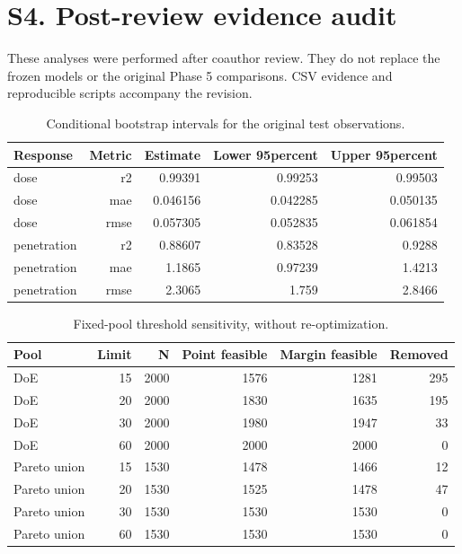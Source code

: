 \section*{S4. Post-review evidence audit}

These analyses were performed after coauthor review. They do not replace the frozen models or the original Phase 5 comparisons. CSV evidence and reproducible scripts accompany the revision.

\begin{table}[H]\centering\scriptsize
\caption{Conditional bootstrap intervals for the original test observations.}
\begin{tabular}{@{}lrrrr@{}}
\toprule Response & Metric & Estimate & Lower 95percent & Upper 95percent\\\midrule
dose & r2 & 0.99391 & 0.99253 & 0.99503\\
dose & mae & 0.046156 & 0.042285 & 0.050135\\
dose & rmse & 0.057305 & 0.052835 & 0.061854\\
penetration & r2 & 0.88607 & 0.83528 & 0.9288\\
penetration & mae & 1.1865 & 0.97239 & 1.4213\\
penetration & rmse & 2.3065 & 1.759 & 2.8466\\
\bottomrule\end{tabular}\end{table}

\begin{table}[H]\centering\scriptsize
\caption{Fixed-pool threshold sensitivity, without re-optimization.}
\begin{tabular}{@{}lrrrrr@{}}
\toprule Pool & Limit & N & Point feasible & Margin feasible & Removed\\\midrule
DoE & 15 & 2000 & 1576 & 1281 & 295\\
DoE & 20 & 2000 & 1830 & 1635 & 195\\
DoE & 30 & 2000 & 1980 & 1947 & 33\\
DoE & 60 & 2000 & 2000 & 2000 & 0\\
Pareto union & 15 & 1530 & 1478 & 1466 & 12\\
Pareto union & 20 & 1530 & 1525 & 1478 & 47\\
Pareto union & 30 & 1530 & 1530 & 1530 & 0\\
Pareto union & 60 & 1530 & 1530 & 1530 & 0\\
\bottomrule\end{tabular}\end{table}

